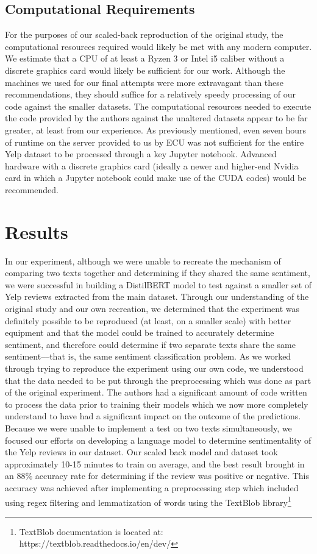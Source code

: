 \documentclass[conference]{IEEEtran}
\begin{document}
\subsection{Computational Requirements}
	For the purposes of our scaled-back reproduction of the original study, the computational resources required would likely be met with any modern computer. We estimate that a CPU of at least a Ryzen 3 or Intel i5 caliber without a discrete graphics card would likely be sufficient for our work. Although the machines we used for our final attempts were more extravagant than these recommendations, they should suffice for a relatively speedy processing of our code against the smaller datasets.
	The computational resources needed to execute the code provided by the authors against the unaltered datasets appear to be far greater, at least from our experience. As previously mentioned, even seven hours of runtime on the server provided to us by ECU was not sufficient for the entire Yelp dataset to be processed through a key Jupyter notebook. Advanced hardware with a discrete graphics card (ideally a newer and higher-end Nvidia card in which a Jupyter notebook could make use of the CUDA codes) would be recommended. 

\section{Results}
	In our experiment, although we were unable to recreate the mechanism of comparing two texts together and determining if they shared the same sentiment, we were successful in building a DistilBERT model to test against a smaller set of Yelp reviews extracted from the main dataset. Through our understanding of the original study and our own recreation, we determined that the experiment was definitely possible to be reproduced (at least, on a smaller scale) with better equipment and that the model could be trained to accurately determine sentiment, and therefore could determine if two separate texts share the same sentiment--–that is, the same sentiment classification problem.
	As we worked through trying to reproduce the experiment using our own code, we understood that the data needed to be put through the preprocessing which was done as part of the original experiment. The authors had a significant amount of code written to process the data prior to training their models which we now more completely understand to have had a significant impact on the outcome of the predictions.
	Because we were unable to implement a test on two texts simultaneously, we focused our efforts on developing a language model to determine sentimentality of the Yelp reviews in our dataset. Our scaled back model and dataset took approximately 10-15 minutes to train on average, and the best result brought in an 88\% accuracy rate for determining if the review was positive or negative. This accuracy was achieved after implementing a preprocessing step which included using regex filtering and lemmatization of words using the TextBlob library\footnote{TextBlob documentation is located at: https://textblob.readthedocs.io/en/dev/}
\end{document}
